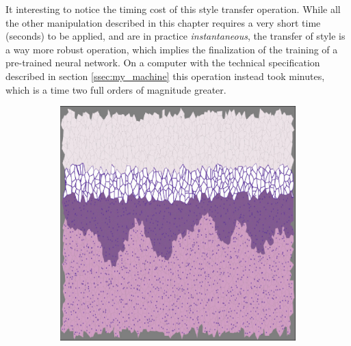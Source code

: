 \documentclass[12pt,a4paper]{report}
\begin{document}
\begin{description}
        It interesting to notice the timing cost of this style transfer operation. While all the other manipulation described in this chapter requires a very short time (seconds) to be applied, and are in practice \textit{instantaneous}, the transfer of style is a way more robust operation, which implies the finalization of the training of a pre-trained neural network. On a computer with the technical specification described in section \ref{ssec:my_machine} this operation instead took minutes, which is a time two full orders of magnitude greater.

        \begin{figure}
            \centering
            \begin{subfigure}[t]{0.3\textwidth}
                 \centering
                 \includegraphics[width = \textwidth]{images/st_nn4}
                 \caption{}
                 \label{fig:st_nn4}
            \end{subfigure}
            \quad
            \begin{subfigure}[t]{0.3\textwidth}
                 \centering

\end{subfigure}
\end{figure}
\end{description}
\end{document}
